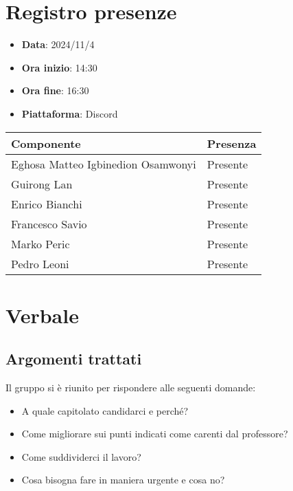 \documentclass[a4paper, 12pt]{article}
\def\data{2024/11/4}
\begin{document}
\section{Registro presenze}
\begin{itemize}
    \item[] \textbf{Data}: \data
    \item[] \textbf{Ora inizio}:  14:30
    \item[] \textbf{Ora fine}: 16:30
    \item[] \textbf{Piattaforma}: Discord	
\end{itemize}
\begin{table}[!h]
\centering
{\renewcommand{\arraystretch}{2}
\begin{tabularx}{\textwidth}{| X | X |}
    \hline
        \textbf{\large Componente} & 
        \textbf{\large Presenza} \\ 
    \hline 
    \hline
        Eghosa Matteo Igbinedion Osamwonyi&
        Presente \\
    \hline 
        Guirong Lan&
        Presente \\
    \hline 
        Enrico Bianchi&
        Presente \\
    \hline 
        Francesco Savio&
        Presente \\
    \hline 
        Marko Peric&
        Presente \\
    \hline 
        Pedro Leoni&
        Presente \\
    \hline 

\end{tabularx}}
\end{table}

\newpage

\section{Verbale}
\subsection{Argomenti trattati}
Il gruppo si è riunito per rispondere alle seguenti domande:
\begin{itemize}
    \item A quale capitolato candidarci e perché?
    \item Come migliorare sui punti indicati come carenti dal professore?
    \item Come suddividerci il lavoro?
    \item Cosa bisogna fare in maniera urgente e cosa no?
\end{itemize}
\end{document}

